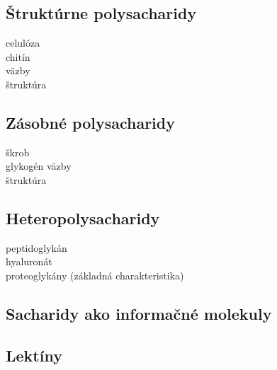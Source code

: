 \subsection*{Štruktúrne polysacharidy}
\tab celulóza\\
\tab chitín\\
\tab \tab väzby\\
\tab \tab štruktúra\\
\subsection*{Zásobné polysacharidy}
\tab škrob\\
\tab glykogén
\tab \tab väzby\\
\tab \tab štruktúra\\
\subsection*{Heteropolysacharidy}
\tab peptidoglykán\\
\tab hyaluronát\\
\tab proteoglykány (základná charakteristika)\\
\subsection*{Sacharidy ako informačné molekuly}
\subsection*{Lektíny}


